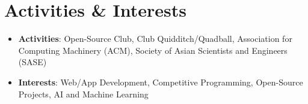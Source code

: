 \documentclass[letterpaper,11pt]{article}
\newcommand{\resumeItemSkills}[2]{
  \item\normalsize{
    \textbf{#1}{: #2 \vspace{-2pt}}
  }
}
\newcommand{\resumeSubItemSkills}[2]{\resumeItemSkills{#1}{#2}\vspace{-4pt}}
\newcommand{\resumeSubHeadingListStartSkillsAwards}{\begin{itemize}[leftmargin=*]}
\newcommand{\resumeSubHeadingListEnd}{\end{itemize}}
\begin{document}
  \section{Activities \& Interests}
  \resumeSubHeadingListStartSkillsAwards
    \resumeSubItemSkills{Activities}
      {Open-Source Club, Club Quidditch/Quadball, Association for Computing Machinery (ACM), Society of Asian 
      Scientists and Engineers (SASE)}
    \resumeSubItemSkills{Interests}
      {Web/App Development, Competitive Programming, Open-Source Projects, AI and Machine Learning}
  \resumeSubHeadingListEnd
  
\end{document}
